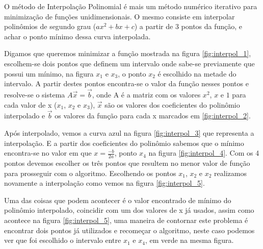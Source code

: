 O método de Interpolação Polinomial é mais um método numérico iterativo para minimização de funções unidimensionais. 
O mesmo consiste em interpolar polinômios de segundo grau ($ax^2+bx+c$) a partir de 3 pontos da função, e achar o ponto mínimo dessa curva interpolada. 

Digamos que queremos minimizar a função mostrada na figura \ref{fig:interpol_1}, escolhem-se dois pontos que definem um intervalo onde sabe-se previamente que possui um mínimo, na figura $x_1$ e $x_3$, o ponto $x_2$ é escolhido na metade do intervalo. A partir destes pontos encontra-se o valor da função nesses pontos e resolve-se o sistema $A\vec{x}=\vec{b}$, onde A é a matriz com os valores $x^2$, $x$ e $1$ para cada valor de x ($x_1$, $x_2$  e $x_3$), $\vec{x}$ são os valores dos coeficientes do polinômio interpolado e $\vec{b}$ os valores da função para cada x marcados em \ref{fig:interpol_2}.



Após interpolado, vemos a curva azul na figura \ref{fig:interpol_3} que representa a interpolação. E a partir dos coeficientes do polinômio sabemos que o mínimo encontra-se no valor em que $x=\frac{-b}{2a}$, ponto $x_4$ na figura \ref{fig:interpol_4}. Com os 4 pontos devemos escolher os três pontos que resultem no menor valor de função para prosseguir com o algoritmo. Escolhendo os pontos $x_1$, $x_2$ e $x_2$ realizamos novamente a interpolação como vemos na figura \ref{fig:interpol_5}.

Uma das coisas que podem acontecer é o valor encontrado de mínimo do polinômio interpolado, coincidir com um dos valores de x já usados, assim como acontece na figura \ref{fig:interpol_5}, uma maneira de contornar este problema é encontrar dois pontos já utilizados e recomeçar o algoritmo, neste caso podemos ver que foi escolhido o intervalo entre $x_1$ e $x_4$, em verde na mesma figura.

